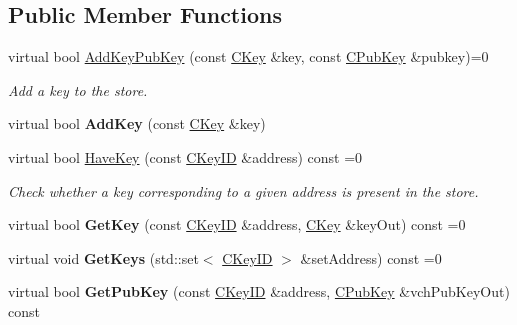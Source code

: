 \subsection*{Public Member Functions}
\begin{DoxyCompactItemize}
\item 
\mbox{\label{class_c_key_store_a1956e4f5860ded321d6f697047d8236a}} 
virtual bool \mbox{\hyperlink{class_c_key_store_a1956e4f5860ded321d6f697047d8236a}{Add\+Key\+Pub\+Key}} (const \mbox{\hyperlink{class_c_key}{C\+Key}} \&key, const \mbox{\hyperlink{class_c_pub_key}{C\+Pub\+Key}} \&pubkey)=0
\begin{DoxyCompactList}\small\item\em Add a key to the store. \end{DoxyCompactList}\item 
\mbox{\label{class_c_key_store_a0b4ca43724cfcc6e2ea70c0baa192750}} 
virtual bool {\bfseries Add\+Key} (const \mbox{\hyperlink{class_c_key}{C\+Key}} \&key)
\item 
\mbox{\label{class_c_key_store_a9398451d4270fae27b29f686a9d43a65}} 
virtual bool \mbox{\hyperlink{class_c_key_store_a9398451d4270fae27b29f686a9d43a65}{Have\+Key}} (const \mbox{\hyperlink{class_c_key_i_d}{C\+Key\+ID}} \&address) const =0
\begin{DoxyCompactList}\small\item\em Check whether a key corresponding to a given address is present in the store. \end{DoxyCompactList}\item 
\mbox{\label{class_c_key_store_a2dffca468fef2e5da2e42a7c983d968a}} 
virtual bool {\bfseries Get\+Key} (const \mbox{\hyperlink{class_c_key_i_d}{C\+Key\+ID}} \&address, \mbox{\hyperlink{class_c_key}{C\+Key}} \&key\+Out) const =0
\item 
\mbox{\label{class_c_key_store_aca5044014720308f191113e7ba297d13}} 
virtual void {\bfseries Get\+Keys} (std\+::set$<$ \mbox{\hyperlink{class_c_key_i_d}{C\+Key\+ID}} $>$ \&set\+Address) const =0
\item 
\mbox{\label{class_c_key_store_ab83687ea4c9df138b21f6ec3e9809f42}} 
virtual bool {\bfseries Get\+Pub\+Key} (const \mbox{\hyperlink{class_c_key_i_d}{C\+Key\+ID}} \&address, \mbox{\hyperlink{class_c_pub_key}{C\+Pub\+Key}} \&vch\+Pub\+Key\+Out) const

\end{DoxyCompactItemize}
